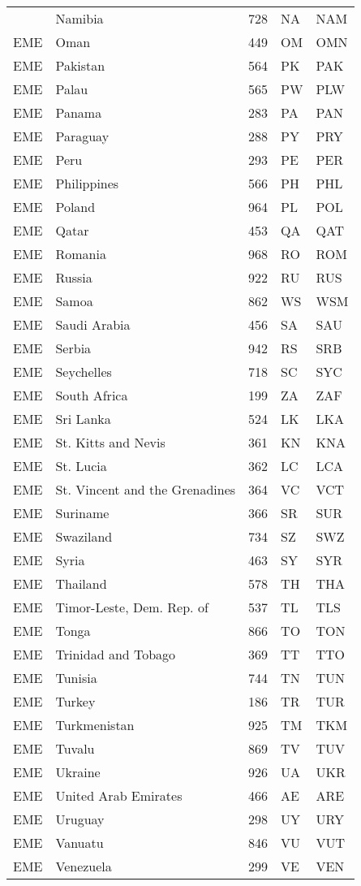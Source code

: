 \documentclass[12pt,a4paper,oldfontcommands]{memoir}
\begin{document}
\begin{table}
\begin{threeparttable}
\begin{tabular}
{EME} & Namibia & 728 & NA & NAM \\
{EME} & Oman & 449 & OM & OMN \\
{EME} & Pakistan & 564 & PK & PAK \\
{EME} & Palau & 565 & PW & PLW \\
{EME} & Panama & 283 & PA & PAN \\
{EME} & Paraguay & 288 & PY & PRY \\
{EME} & Peru & 293 & PE & PER \\
{EME} & Philippines & 566 & PH & PHL \\
{EME} & Poland & 964 & PL & POL \\
{EME} & Qatar & 453 & QA & QAT \\
{EME} & Romania & 968 & RO & ROM \\
{EME} & Russia & 922 & RU & RUS \\
{EME} & Samoa & 862 & WS & WSM \\
{EME} & Saudi Arabia & 456 & SA & SAU \\
{EME} & Serbia & 942 & RS & SRB \\
{EME} & Seychelles & 718 & SC & SYC \\
{EME} & South Africa & 199 & ZA & ZAF \\
{EME} & Sri Lanka & 524 & LK & LKA \\
{EME} & St. Kitts and Nevis & 361 & KN & KNA \\
{EME} & St. Lucia & 362 & LC & LCA \\
{EME} & St. Vincent and the Grenadines & 364 & VC & VCT \\
{EME} & Suriname & 366 & SR & SUR \\
{EME} & Swaziland & 734 & SZ & SWZ \\
{EME} & Syria & 463 & SY & SYR \\
{EME} & Thailand & 578 & TH & THA \\
{EME} & Timor-Leste, Dem. Rep. of & 537 & TL & TLS \\
{EME} & Tonga & 866 & TO & TON \\
{EME} & Trinidad and Tobago & 369 & TT & TTO \\
{EME} & Tunisia & 744 & TN & TUN \\
{EME} & Turkey & 186 & TR & TUR \\
{EME} & Turkmenistan & 925 & TM & TKM \\
{EME} & Tuvalu & 869 & TV & TUV \\
{EME} & Ukraine & 926 & UA & UKR \\
{EME} & United Arab Emirates & 466 & AE & ARE \\
{EME} & Uruguay & 298 & UY & URY \\
{EME} & Vanuatu & 846 & VU & VUT \\
{EME} & Venezuela & 299 & VE & VEN \\


\end{tabular}
\end{threeparttable}
\end{table}
\end{document}
